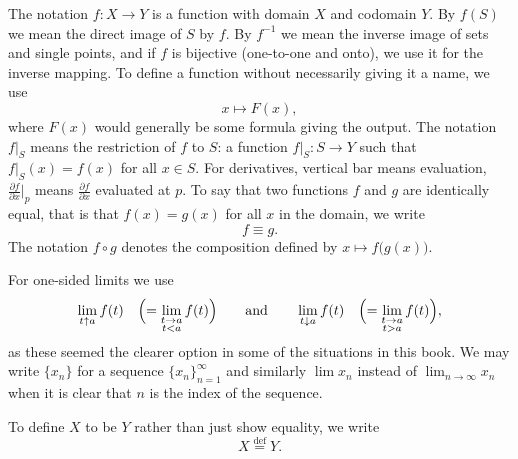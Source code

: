 \documentclass[12pt,openany]{book}
\theoremstyle{plain}
\theoremstyle{remark}
\theoremstyle{definition}
\theoremstyle{exercise}
\theoremstyle{example}
\begin{document}
%
The notation $f \colon X \to Y$ is a function with domain $X$ and
codomain $Y$.  By $f(S)$ we mean the direct image of $S$ by $f$.
By $f^{-1}$ we mean the inverse image of sets and
single points, and if $f$ is bijective (one-to-one and onto),
we use it for the inverse mapping.
To define a function without necessarily giving it a name, we use
%
\begin{equation*}
x \mapsto F(x) ,
\end{equation*}
where $F(x)$ would generally be some formula giving the output.
The notation
%
$f|_S$
means the restriction of $f$ to $S$:
a function
$f|_S \colon S \to Y$ such that $f|_S(x) = f(x)$ for all $x \in S$.
For derivatives, vertical bar means evaluation,
$\frac{\partial f}{\partial x}\big|_p$ means 
$\frac{\partial f}{\partial x}$ evaluated at $p$.
To say that two functions $f$ and $g$ are identically equal,
that is that $f(x) = g(x)$ for all $x$ in the domain,
we write
%
\begin{equation*}
f \equiv g .
\end{equation*}
The notation
%
$f \circ g$
denotes the composition defined by $x \mapsto f\bigl(g(x)\bigr)$.

For one-sided limits we use
%
%
\begin{equation*}
\lim_{t \uparrow a} f(t) \quad \Bigl( = \lim_{\substack{t \to a\\t < a}} f(t)
\Bigr)
\qquad \text{and} \qquad
\lim_{t \downarrow a} f(t) \quad \Bigl( = \lim_{\substack{t \to a\\t > a}} f(t)
\Bigr) ,
\end{equation*}
as these seemed the clearer option in some of the situations in this book.
We may write $\{ x_n \}$ for a sequence $\{x_n\}_{n=1}^\infty$ and similarly
$\lim x_n$ instead of $\lim_{n\to \infty} x_n$ when it is clear that $n$ is
the index of the sequence.

To define $X$ to be $Y$ rather than just show equality, we write
%
\begin{equation*}
X
\overset{\text{def}}{=}
Y .
\end{equation*}

\end{document}
